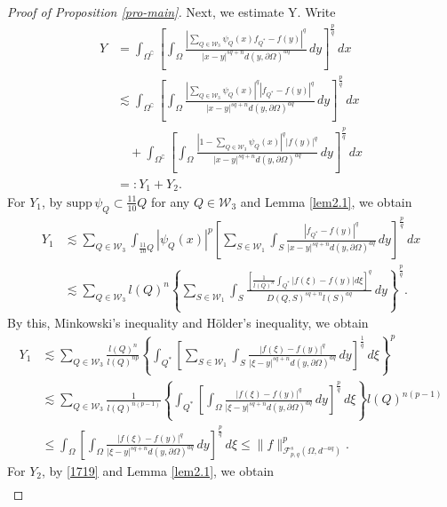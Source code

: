 \documentclass[11pt,twoside]{article}
\def\cf{{\mathcal F}}
\def\qxing{Q^{*}}
\def\boz{{\Omega}}
\def\pa{\partial}                %
\theoremstyle{mylem}
\theoremstyle{definition}
\numberwithin{equation}{section}
\begin{document}
\begin{proof}[Proof of Proposition \ref{pro-main}]
Next, we estimate Y. Write
\begin{align}\label{eqn-5.8}
Y&= \int_{{\boz}^\complement} \left[ \int_{\boz} \frac{| \sum_{Q\in\mathcal{W}_3} \psi_Q(x) f_{Q^{*}}-f(y)|^q}{|x - y|^{s q + n}d(y,\pa\boz)^{aq}}\,dy \right]^{\frac{p}{q}}\,dx  \nonumber \\
&\lesssim \int_{{\boz}^\complement} \left[ \int_{\boz} \frac{| \sum_{Q\in\mathcal{W}_3} \psi_Q(x)|^q | f_{Q^{*}}-f(y)|^q}{|x - y|^{s q + n}d(y,\pa\boz)^{aq}}\,dy \right]^{\frac{p}{q}}\,dx \nonumber \\
&\quad+ \int_{{\boz}^\complement} \left[ \int_{\boz} \frac{ |1- \sum_{Q\in\mathcal{W}_3} \psi_Q(x) |^q | f(y) |^q}{|x - y|^{s q + n}d(y,\pa\boz)^{aq}}\,dy \right]^{\frac{p}{q}}\,dx  \nonumber \\
&=:Y_1+Y_2.
\end{align}
For $Y_1$,
by $\text{supp}\,\psi_Q \subset \frac{11}{10}Q$ for any $Q\in\mathcal{W}_3$ and Lemma \ref{lem2.1}, we obtain
\begin{align*}
Y_1
&\lesssim \sum_{Q\in\mathcal{W}_3} \int_{\frac{11}{10}Q} | \psi_Q(x)|^p \left[ \sum_{S\in\mathcal{W}_1}\int_{S} \frac{ | f_{Q^{*}}-f(y)|^q}{|x - y|^{s q + n}d(y,\pa\boz)^{aq}}\,dy \right]^{\frac{p}{q}}\,dx \\
&\lesssim \sum_{Q\in\mathcal{W}_3} l(Q)^n \left\{ \sum_{S\in\mathcal{W}_1}\int_{S} \frac{\left[ \frac{1}{l(Q)^n}\int_{Q^{*}} |f(\xi)-f(y)| d\xi\right]^q}{D(Q,S)^{s q + n}l(S)^{aq}}\,dy \right\}^{\frac{p}{q}}.
\end{align*}
By this, Minkowski's inequality and H\"older's inequality, we obtain
\begin{align}\label{eqn-3.7}
Y_1
&\lesssim \sum_{Q\in\mathcal{W}_3} \frac{l(Q)^n}{l(Q)^{np}} \left\{ \int_{\qxing} \left[\sum_{S\in\mathcal{W}_1}\int_{S}\frac{ |f(\xi)-f(y)|^q }{|\xi - y|^{s q + n}d(y,\pa\boz)^{aq}} \,dy\right]^{\frac{1}{q}}\,d\xi \right\}^{p}  \nonumber \\
&\lesssim \sum_{Q\in\mathcal{W}_3} \frac{1}{l(Q)^{n(p-1)}} \left\{ \int_{\qxing} \left[\int_{\boz}\frac{ |f(\xi)-f(y)|^q }{|\xi - y|^{s q + n}d(y,\pa\boz)^{aq}}\,dy\right]^{\frac{p}{q}}\,d\xi \right\}l(Q)^{n(p-1)} \nonumber \\
&\leq \int_{\boz} \left[\int_{\boz}\frac{ |f(\xi)-f(y)|^q }{|\xi - y|^{s q + n}d(y,\pa\boz)^{aq}}\,dy\right]^{\frac{p}{q}}\,d\xi
\leq \| f \|_{\cf_{p,q}^{s}(\boz,d^{-aq})}^{p}.
\end{align}
For $Y_2$, by \eqref{1719} and Lemma \ref{lem2.1}, we obtain
\begin{align}\label{1538}

\end{align}
\end{proof}
\end{document}
